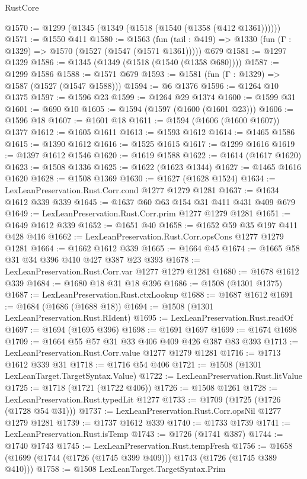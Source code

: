\begin{lexlean}{RustCore}
\begin{coremodule}
@1570 := @1299 (@1345 (@1349 (@1518 (@1540 (@1358 (@412 @1361))))))
@1571 := @1550 @411
@1580 := @1563
    (fun (tail : @419) => @1330 (fun (Γ : @1329) => @1570 (@1527 (@1547 (@1571 @1361)))))
    @679
@1581 := @1297 @1329
@1586 := @1345 (@1349 (@1518 (@1540 (@1358 @680))))
@1587 := @1299 @1586
@1588 := @1571 @679
@1593 := @1581 (fun (Γ : @1329) => @1587 (@1527 (@1547 @1588)))
@1594 := @6 @1376
@1596 := @1264 @10 @1375
@1597 := @1596 @23
@1599 := @1264 @29 @1374
@1600 := @1599 @31
@1601 := @690 @10
@1605 := @1594 (@1597 (@1600 (@1601 @23)))
@1606 := @1596 @18
@1607 := @1601 @18
@1611 := @1594 (@1606 (@1600 @1607)) @1377
@1612 := @1605 @1611
@1613 := @1593 @1612
@1614 := @1465 @1586
@1615 := @1390 @1612
@1616 := @1525 @1615
@1617 := @1299 @1616
@1619 := @1397 @1612 @1546
@1620 := @1619 @1588
@1622 := @1614 (@1617 @1620)
@1623 := @1508 @1336
@1625 := @1622 (@1623 @1344)
@1627 := @1465 @1616 @1620
@1628 := @1508 @1369
@1630 := @1627 (@1628 @1524)
@1634 := LexLeanPreservation.Rust.Corr.cond @1277 @1279 @1281
@1637 := @1634 @1612 @339 @339
@1645 := @1637 @60 @63 @154 @31 @411 @431 @409 @679
@1649 := LexLeanPreservation.Rust.Corr.prim @1277 @1279 @1281
@1651 := @1649 @1612 @339
@1652 := @1651 @40
@1658 := @1652 @59 @35 @197 @411 @428 @416
@1662 := LexLeanPreservation.Rust.Corr.opsCons @1277 @1279 @1281
@1664 := @1662 @1612 @339
@1665 := @1664 @45
@1674 := @1665 @58 @31 @34 @396 @410 @427 @387 @23 @393
@1678 := LexLeanPreservation.Rust.Corr.var @1277 @1279 @1281
@1680 := @1678 @1612 @339
@1684 := @1680 @18 @31 @18 @396
@1686 := @1508 (@1301 @1375)
@1687 := LexLeanPreservation.Rust.ctxLookup
@1688 := @1687 @1612
@1691 := @1684 (@1686 (@1688 @18))
@1694 := @1508 (@1301 LexLeanPreservation.Rust.RIdent)
@1695 := LexLeanPreservation.Rust.readOf
@1697 := @1694 (@1695 @396)
@1698 := @1691 @1697
@1699 := @1674 @1698
@1709 := @1664 @55 @57 @31 @33 @406 @409 @426 @387 @83 @393
@1713 := LexLeanPreservation.Rust.Corr.value @1277 @1279 @1281
@1716 := @1713 @1612 @339 @31
@1718 := @1716 @54 @406
@1721 := @1508 (@1301 LexLeanTarget.TargetSyntax.Value)
@1722 := LexLeanPreservation.Rust.litValue
@1725 := @1718 (@1721 (@1722 @406))
@1726 := @1508 @1261
@1728 := LexLeanPreservation.Rust.typedLit @1277
@1733 := @1709 (@1725 (@1726 (@1728 @54 @31)))
@1737 := LexLeanPreservation.Rust.Corr.opsNil @1277 @1279 @1281
@1739 := @1737 @1612 @339
@1740 := @1733 @1739
@1741 := LexLeanPreservation.Rust.isTemp
@1743 := @1726 (@1741 @387)
@1744 := @1740 @1743
@1745 := LexLeanPreservation.Rust.tempFresh
@1756 := @1658 (@1699 (@1744 (@1726 (@1745 @399 @409))) @1743 (@1726 (@1745 @389 @410)))
@1758 := @1508 LexLeanTarget.TargetSyntax.Prim

\end{coremodule}
\end{lexlean}

